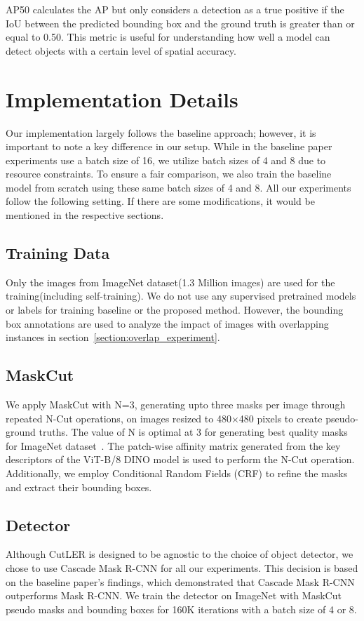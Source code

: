 AP50 calculates the AP but only considers a detection as a true positive if the IoU between the predicted bounding box and the ground truth is greater than or equal to 0.50. This metric is useful for understanding how well a model can detect objects with a certain level of spatial accuracy.

\section{Implementation Details}
\label{section:implementation_details}
Our implementation largely follows the baseline approach; however, it is important to note a key difference in our setup. While in the baseline paper experiments use a batch size of 16, we utilize batch sizes of 4 and 8 due to resource constraints. To ensure a fair comparison, we also train the baseline model from scratch using these same batch sizes of 4 and 8. All our experiments follow the following setting. If there are some modifications, it would be mentioned in the respective sections.

\subsection{Training Data}
Only the images from ImageNet dataset(1.3 Million images) are used for the training(including self-training). We do not use any supervised pretrained models or labels for training baseline or the proposed method. However, the bounding box annotations are used to analyze the impact of images with overlapping instances in section~\ref{section:overlap_experiment}.

\subsection{MaskCut}

We apply MaskCut with N=3, generating upto three masks per image through repeated N-Cut operations, on images resized to 480×480 pixels to create pseudo-ground truths. The value of N is optimal at 3 for generating best quality masks for ImageNet dataset~\cite{wang2023cut}. The patch-wise affinity matrix generated from the key descriptors of the ViT-B/8 DINO model is used to perform the N-Cut operation. Additionally, we employ Conditional Random Fields (CRF) to refine the masks and extract their bounding boxes.

\subsection{Detector}
Although CutLER is designed to be agnostic to the choice of object detector, we chose to use Cascade Mask R-CNN for all our experiments. This decision is based on the baseline paper's findings, which demonstrated that Cascade Mask R-CNN outperforms Mask R-CNN. We train the detector on ImageNet with MaskCut pseudo masks and bounding boxes for 160K iterations with a batch size of 4 or 8. 

